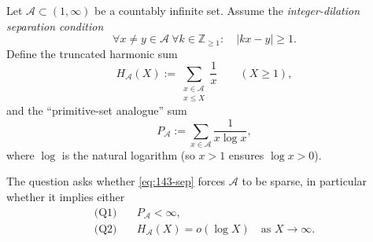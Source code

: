 Let $\mathcal A\subset (1,\infty)$ be a countably infinite set. Assume the 
\emph{integer-dilation separation condition}
\begin{equation}
\label{eq:143-sep}
\forall x\neq y\in \mathcal A\ \forall k\in\mathbb Z_{\ge 1}:\quad |kx-y|\ge 1.
\end{equation}
Define the truncated harmonic sum
\[
H_{\mathcal A}(X):=\sum_{\substack{x\in\mathcal A\\ x\le X}}\frac1x\qquad (X\ge 1),
\]
and the ``primitive-set analogue'' sum
\[
P_{\mathcal A}:=\sum_{x\in\mathcal A}\frac{1}{x\log x},
\]
where $\log$ is the natural logarithm (so $x>1$ ensures $\log x>0$).

The question asks whether \eqref{eq:143-sep} forces $\mathcal A$ to be sparse, in particular whether it implies either
\begin{align*}
\text{(Q1)}\quad & P_{\mathcal A}<\infty,\\
\text{(Q2)}\quad & H_{\mathcal A}(X)=o(\log X)\quad\text{as }X\to\infty.
\end{align*}
